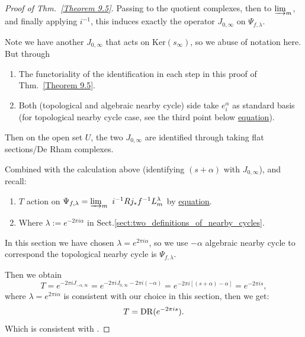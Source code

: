 \begin{proof}[Proof of Thm.~\ref{Theorem 9.5}]
    Passing to the quotient complexes, then to $\varinjlim_m$, and finally applying $i^{-1}$, this induces exactly the operator $J_{0,\infty}$ on $\Psi_{f,\lambda}$.

    Note we have another $J_{0,\infty}$ that acts on $\mathrm{Ker}(s_\infty)$, so we abuse of notation here.
    But through
    \begin{enumerate}
        \item The functoriality of the identification in each step in this proof of Thm.~\ref{Theorem 9.5}.
        \item Both (topological and algebraic nearby cycle) side take $e^{\alpha}_i$ as standard basis (for topological nearby cycle case, see the third point below \hyperref[eq:local_system_L^lambda_m]{equation}).
    \end{enumerate}
    Then on the open set $U$, the two $J_{0,\infty}$ are identified through taking flat sections/De Rham complexes.

    \medskip

    Combined with the calculation above (identifying $(s+\alpha)$ with $J_{0,\infty}$),
    and recall:
    \begin{enumerate}
        \item $T$ action on $\Psi_{f,\lambda}=\varinjlim_m\ i^{-1} Rj_*f^{-1}L_m^{\lambda}$ by \hyperref[eq:local_system_L^lambda_m]{equation}.
        \item Where $\lambda := e^{-2\pi i \alpha}$ in Sect.\ref{sect:two_definitions_of_nearby_cycles}.
    \end{enumerate}
    In this section we have chosen $\lambda = e^{2\pi i \alpha}$,
    so we use $-\alpha$ algebraic nearby cycle to correspond the topological nearby cycle is $\Psi_{f,\lambda}$.

    Then we obtain
    \[
        T= e^{-2\pi i J_{-\alpha,\infty}} = e^{-2\pi i J_{0,\infty} - 2\pi i (-\alpha)} = e^{-2\pi i[(s+\alpha)-\alpha]}=e^{-2\pi i s},
    \]
    where $\lambda = e^{2\pi i \alpha}$ is consistent with our choice in this section, then we get:
    \[
        T= \mathrm{DR}(e^{-2\pi i s}).
    \]
    Which is consistent with \cite{Wu2020ComparisonNearbyCyclesBfunctions}.

\end{proof}

